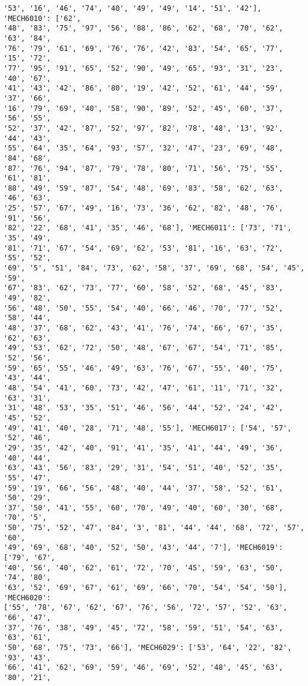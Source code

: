 \documentclass[11pt]{article}
\begin{document}
\begin{Verbatim}[commandchars=\\\{\}]
'53', '16', '46', '74', '40', '49', '49', '14', '51', '42'], 'MECH6010': ['62',
'48', '83', '75', '97', '56', '88', '86', '62', '68', '70', '62', '63', '84',
'76', '79', '61', '69', '76', '76', '42', '83', '54', '65', '77', '15', '72',
'77', '95', '91', '65', '52', '90', '49', '65', '93', '31', '23', '40', '67',
'41', '43', '42', '86', '80', '19', '42', '52', '61', '44', '59', '37', '66',
'16', '79', '69', '40', '58', '90', '89', '52', '45', '60', '37', '56', '55',
'52', '37', '42', '87', '52', '97', '82', '78', '48', '13', '92', '44', '43',
'55', '64', '35', '64', '93', '57', '32', '47', '23', '69', '48', '84', '68',
'87', '76', '94', '87', '79', '78', '80', '71', '56', '75', '55', '61', '81',
'88', '49', '59', '87', '54', '48', '69', '83', '58', '62', '63', '46', '63',
'25', '57', '67', '49', '16', '73', '36', '62', '82', '48', '76', '91', '56',
'82', '22', '68', '41', '35', '46', '68'], 'MECH6011': ['73', '71', '35', '49',
'81', '71', '67', '54', '69', '62', '53', '81', '16', '63', '72', '55', '52',
'69', '5', '51', '84', '73', '62', '58', '37', '69', '68', '54', '45', '59',
'67', '83', '62', '73', '77', '60', '58', '52', '68', '45', '83', '49', '82',
'56', '48', '50', '55', '54', '40', '66', '46', '70', '77', '52', '58', '44',
'48', '37', '68', '62', '43', '41', '76', '74', '66', '67', '35', '62', '63',
'49', '53', '62', '72', '50', '48', '67', '67', '54', '71', '85', '52', '56',
'59', '65', '55', '46', '49', '63', '76', '67', '55', '40', '75', '43', '44',
'48', '54', '41', '60', '73', '42', '47', '61', '11', '71', '32', '63', '31',
'31', '48', '53', '35', '51', '46', '56', '44', '52', '24', '42', '45', '52',
'49', '41', '40', '28', '71', '48', '55'], 'MECH6017': ['54', '57', '52', '46',
'29', '35', '42', '40', '91', '41', '35', '41', '44', '49', '36', '40', '44',
'63', '43', '56', '83', '29', '31', '54', '51', '40', '52', '35', '55', '47',
'59', '19', '66', '56', '48', '40', '44', '37', '58', '52', '61', '50', '29',
'37', '50', '41', '55', '60', '70', '49', '40', '60', '30', '68', '70', '5',
'50', '75', '52', '47', '84', '3', '81', '44', '44', '68', '72', '57', '60',
'49', '69', '68', '40', '52', '50', '43', '44', '7'], 'MECH6019': ['79', '67',
'40', '56', '40', '62', '61', '72', '70', '45', '59', '63', '50', '74', '80',
'63', '52', '69', '67', '61', '69', '66', '70', '54', '54', '50'], 'MECH6020':
['55', '78', '67', '62', '67', '76', '56', '72', '57', '52', '63', '66', '47',
'37', '76', '38', '49', '45', '72', '58', '59', '51', '54', '63', '63', '61',
'50', '68', '75', '73', '66'], 'MECH6029': ['53', '64', '22', '82', '93', '43',
'66', '41', '62', '69', '59', '46', '69', '52', '48', '45', '63', '80', '21',

\end{Verbatim}
\end{document}
